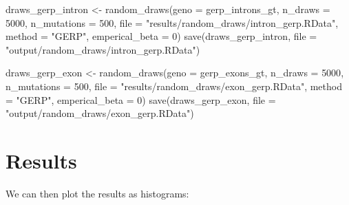 \documentclass[
  letterpaper,
  DIV=11,
  numbers=noendperiod]{scrreprt}
\newenvironment{Shaded}{}{}
\newcommand{\AttributeTok}[1]{\textcolor[rgb]{0.84,0.23,0.29}{#1}}
\newcommand{\DecValTok}[1]{\textcolor[rgb]{0.00,0.36,0.77}{#1}}
\newcommand{\FunctionTok}[1]{\textcolor[rgb]{0.44,0.26,0.76}{#1}}
\newcommand{\NormalTok}[1]{\textcolor[rgb]{0.14,0.16,0.18}{#1}}
\newcommand{\OtherTok}[1]{\textcolor[rgb]{0.44,0.26,0.76}{#1}}
\newcommand{\StringTok}[1]{\textcolor[rgb]{0.01,0.18,0.38}{#1}}
\begin{document}
\begin{Shaded}
\begin{Highlighting}[]
\NormalTok{draws\_gerp\_intron }\OtherTok{\textless{}{-}} \FunctionTok{random\_draws}\NormalTok{(}\AttributeTok{geno =}\NormalTok{ gerp\_introns\_gt, }\AttributeTok{n\_draws =} \DecValTok{5000}\NormalTok{, }\AttributeTok{n\_mutations =} \DecValTok{500}\NormalTok{, }\AttributeTok{file =} \StringTok{"results/random\_draws/intron\_gerp.RData"}\NormalTok{, }\AttributeTok{method =} \StringTok{"GERP"}\NormalTok{, }\AttributeTok{emperical\_beta =} \DecValTok{0}\NormalTok{)}
\FunctionTok{save}\NormalTok{(draws\_gerp\_intron, }\AttributeTok{file =} \StringTok{"output/random\_draws/intron\_gerp.RData"}\NormalTok{)}

\NormalTok{draws\_gerp\_exon }\OtherTok{\textless{}{-}} \FunctionTok{random\_draws}\NormalTok{(}\AttributeTok{geno =}\NormalTok{ gerp\_exons\_gt, }\AttributeTok{n\_draws =} \DecValTok{5000}\NormalTok{, }\AttributeTok{n\_mutations =} \DecValTok{500}\NormalTok{, }\AttributeTok{file =} \StringTok{"results/random\_draws/exon\_gerp.RData"}\NormalTok{, }\AttributeTok{method =} \StringTok{"GERP"}\NormalTok{, }\AttributeTok{emperical\_beta =} \DecValTok{0}\NormalTok{)}
\FunctionTok{save}\NormalTok{(draws\_gerp\_exon, }\AttributeTok{file =} \StringTok{"output/random\_draws/exon\_gerp.RData"}\NormalTok{)}
\end{Highlighting}
\end{Shaded}

\section{Results}\label{results-5}

We can then plot the results as histograms:
\end{document}
